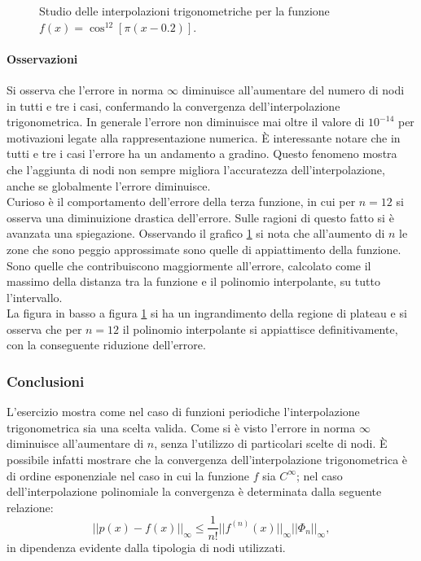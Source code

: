 \documentclass[letterpaper, 12pt]{article}
\numberwithin{equation}{section}    %
\begin{document}
\begin{figure}[!ht]
\begin{minipage}[b]{0.40\textwidth}
    \end{minipage}
    \caption{Studio delle interpolazioni trigonometriche per la funzione $f(x) = \cos^{12}[\pi (x-0.2)]$.}
    \label{fig:es4_6_1_3}
\end{figure}

\paragraph{Osservazioni}
Si osserva che l'errore in norma $\infty$ diminuisce all'aumentare del numero di nodi in tutti e tre i casi, 
confermando la convergenza dell'interpolazione trigonometrica. In generale l'errore non diminuisce mai oltre
il valore di $10^{-14}$ per motivazioni legate alla rappresentazione numerica. È interessante notare che 
in tutti e tre i casi l'errore ha un andamento a gradino. Questo fenomeno mostra che l'aggiunta di nodi 
non sempre migliora l'accuratezza dell'interpolazione, anche se globalmente l'errore diminuisce. \\
Curioso è il comportamento dell'errore della terza funzione, in cui per $n = 12$ si osserva una
diminuizione drastica dell'errore. Sulle ragioni di questo fatto si è avanzata una spiegazione. 
Osservando il grafico \ref{fig:es4_6_1_3} si nota che all'aumento di $n$ le zone che sono peggio approssimate sono 
quelle di appiattimento della funzione. Sono quelle che contribuiscono maggiormente all'errore, calcolato
come il massimo della distanza tra la funzione e il polinomio interpolante, su tutto l'intervallo. \\
La figura in basso a figura \ref{fig:es4_6_1_3} si ha un ingrandimento della regione di plateau e 
si osserva che per $n=12$ il polinomio interpolante si appiattisce definitivamente, con la conseguente 
riduzione dell'errore.

\subsubsection{Conclusioni}
L'esercizio mostra come nel caso di funzioni periodiche l'interpolazione trigonometrica sia una scelta
valida. Come si è visto l'errore in norma $\infty$ diminuisce all'aumentare di $n$, senza 
l'utilizzo di particolari scelte di nodi. È possibile infatti mostrare che la convergenza 
dell'interpolazione trigonometrica è di ordine esponenziale nel caso in cui la funzione $f$ sia 
$C^{\infty}$; nel caso dell'interpolazione polinomiale la convergenza è determinata dalla seguente relazione:
\begin{equation}
    ||p(x)-f(x)||_{\infty} \leq \frac{1}{n!} ||f^{(n)}(x)||_{\infty} ||\Phi_n||_{\infty},
\end{equation}
in dipendenza evidente dalla tipologia di nodi utilizzati. \\
\end{document}
